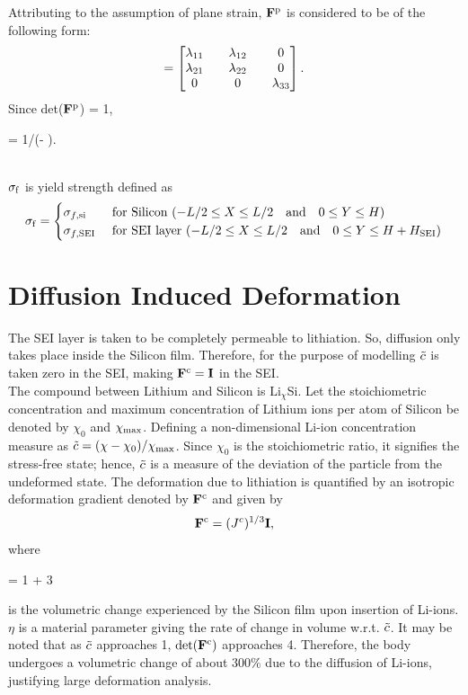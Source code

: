 Attributing to the assumption of plane strain, $\mathbf{F}^{\rm{p}}$ is considered to be of the following form:
\begin{gather}
 [\F^\p] = \tensor{\lambda}.
\end{gather}
Since det($\mathbf{F}^{\rm{p}}$) = 1, 
\begin{nonumbereq}
     \lamzz = 1/(\lamxx \lamyy - \lamxy \lamyx).
\end{nonumbereq} \\
$\sigma_{\rm{f}}$ is yield strength defined as 
\[ \sigma_{\rm{f}} =  \begin{cases} 
      \sigma_{f, {\rm{si}}} & \text{ for Silicon} \, \, (-L/2 \le X \le L/2 {\rm{ \quad and \quad}} 0 \le Y \le H) \\
      \sigma_{f, {\rm{SEI}}} & \text{ for SEI layer} \, \, (-L/2 \le X \le L/2 {\rm{ \quad and \quad}} 0 \le Y \le H+H_{\rm{SEI}})
   \end{cases}
\]


\section{Diffusion Induced Deformation}
The SEI layer is taken to be completely permeable to lithiation. So, diffusion only takes place inside the Silicon film. Therefore, for the purpose of modelling $\tilde{c}$ is taken zero in the SEI, making $\mathbf{F}^{\rm{c}}=\mathbf{I}$ in the SEI.\\ 
The compound between Lithium and Silicon is $\text{Li}_{\chi}$Si. Let the stoichiometric concentration and maximum concentration of Lithium ions per atom of Silicon be denoted by $\chi_0$ and $\chi_{\rm{max}}$. Defining a non-dimensional Li-ion concentration measure as $\tilde{c} = (\chi-\chi_{0})/\chi_{{\rm{max}}}$. Since $\chi_{0}$ is the stoichiometric ratio, it signifies the stress-free state; hence, $\tilde{c}$ is a measure of the deviation of the particle from the undeformed state. The deformation due to lithiation is quantified by an isotropic deformation gradient denoted by $\mathbf{F}^{\rm{c}}$ and given by
\begin{gather}
    \mathbf{F}^{\rm{c}} = ({J^c})^{1/3} \mathbf{I},
\end{gather}
where \begin{nonumbereq}\jc = 1 + 3 \eta \xmax \tc\end{nonumbereq} is the volumetric change experienced by the Silicon film upon insertion of Li-ions. $\eta$ is a material parameter giving the rate of change in volume w.r.t. $\tilde{c}$. It may be noted that as $\tilde{c}$ approaches 1, $\mathrm{det}(\mathbf{F}^{\rm{c}})$ approaches 4. Therefore, the body undergoes a volumetric change of about 300\% due to the diffusion of Li-ions, justifying large deformation analysis.
